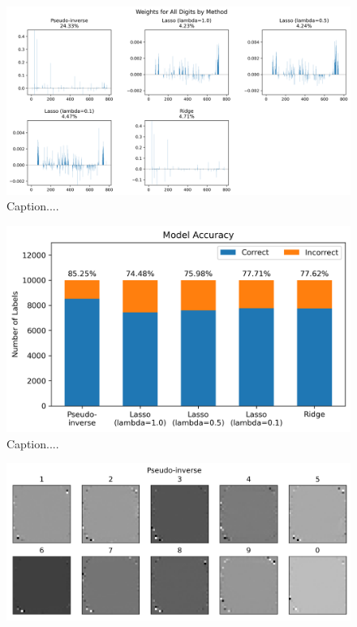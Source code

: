 \documentclass[10pt]{article}
\begin{document}
\begin{figure}[ht]
\centerline{\includegraphics[scale=0.5]{figures/bar_plot_loadings_all_digits_all_methods.png}}
\caption{Caption....}
\label{fig2}
\end{figure}

\begin{figure}[ht]
\centerline{\includegraphics[scale=0.75]{figures/all_data_accuracy_comparison.png}}
\caption{Caption....}
\label{fig3}
\end{figure}

\begin{figure}[ht]
\centerline{\includegraphics[scale=0.8]{figures/weight_matrix_pinv.png}}
\label{fig4a}
\end{figure}
\end{document}
